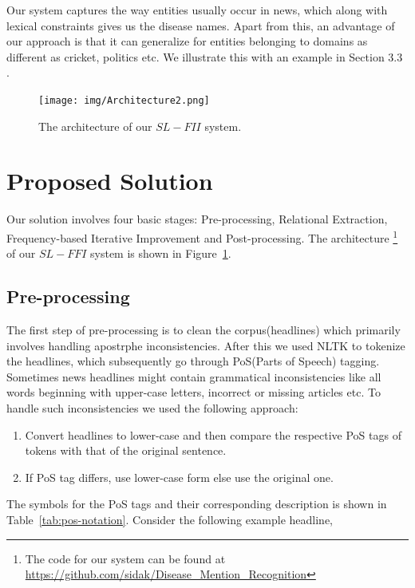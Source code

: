 \documentclass{article}
\begin{document}
Our system captures the way entities usually occur in news, which along with lexical constraints gives us the disease names. Apart from this, an advantage of our approach is that it can generalize for entities belonging to domains as different as cricket, politics etc. We illustrate this with an example in Section 3.3 . 



\begin{figure}[t]
\centering
\texttt{[image: img/Architecture2.png]}
\caption{The architecture of our $SL-FII$ system.}
\label{fig:architecture}
\end{figure}


\section{Proposed Solution}

Our solution involves four basic stages: Pre-processing, Relational Extraction, Frequency-based Iterative Improvement and Post-processing. The architecture \footnote{The code for our system can be found at \\ \url{https://github.com/sidak/Disease_Mention_Recognition}} of our $SL-FFI$ system is shown in Figure~\ref{fig:architecture}. 

\subsection{Pre-processing}

The first step of pre-processing is to clean the corpus(headlines) which primarily involves handling apostrphe inconsistencies. After this we used NLTK to tokenize the headlines, which subsequently go through PoS(Parts of Speech) tagging. Sometimes news headlines might contain grammatical inconsistencies like all words beginning with upper-case letters, incorrect or missing articles etc.  To handle such inconsistencies we used the following approach:
\begin{enumerate}

\item Convert headlines to lower-case and then compare the respective PoS tags of tokens with that of the original sentence.

\item If PoS tag differs, use lower-case form else use the original one.
\end{enumerate}

The symbols for the PoS tags and their corresponding description is shown in Table~\ref{tab:pos-notation}. Consider the following example headline,
\end{document}
